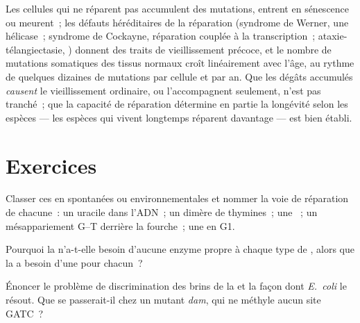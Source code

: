 \begin{remark}\label{rem:b3:dna-repair:ageing}
Les cellules qui ne réparent pas accumulent des mutations, entrent en
sénescence ou meurent~; les défauts héréditaires de la réparation
(syndrome de Werner, une hélicase~; syndrome de Cockayne, réparation
couplée à la transcription~; ataxie-télangiectasie, ) donnent des
traits de vieillissement précoce, et le nombre de mutations somatiques
des tissus normaux croît linéairement avec l'âge, au rythme de
quelques dizaines de mutations par cellule et par an. Que les dégâts
accumulés \emph{causent} le vieillissement ordinaire, ou l'accompagnent
seulement, n'est pas tranché~; que la capacité de réparation détermine
en partie la longévité selon les espèces --- les espèces qui vivent
longtemps réparent davantage --- est bien établi.
\end{remark}

\section{Exercices}

\begin{exercise}[$\star$]\label{exo:b3:dna-repair:1}
Classer ces  en spontanées ou environnementales et nommer la
voie de réparation de chacune~: un uracile dans l'ADN~; un dimère de
thymines~; une ~; un mésappariement G--T derrière la
fourche~; une  en G1.
\end{exercise}

\begin{exercise}[$\star$]\label{exo:b3:dna-repair:2}
Pourquoi la  n'a-t-elle besoin
d'aucune enzyme propre à chaque type de , alors que la  a besoin d'une  pour chacun~?
\end{exercise}

\begin{exercise}[$\star$]\label{exo:b3:dna-repair:3}
Énoncer le problème de discrimination des brins de la  et la façon dont \emph{E.~coli} le résout. Que se
passerait-il chez un mutant \emph{dam}, qui ne méthyle aucun site GATC~?
\end{exercise}

